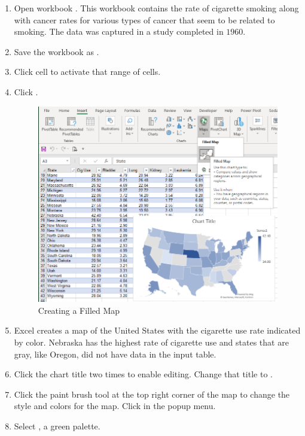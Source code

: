 \begin{enumbox}
	\begin{enumerate}
		\item Open workbook . This workbook contains the rate of cigarette smoking along with cancer rates for various types of cancer that seem to be related to smoking. The data was captured in a study completed in $ 1960 $.
		\item Save the workbook as .
		\item Click cell  to activate that range of cells.
		\item Click .

		\begin{figure}[H]
			\centering
			\includegraphics[width=\maxwidth{.95\linewidth}]{gfx/ch08_fig90}
			\caption{Creating a Filled Map}
			\label{08:fig90}
		\end{figure}

		\item Excel creates a map of the United States with the cigarette use rate indicated by color. Nebraska has the highest rate of cigarette use and states that are gray, like Oregon, did not have data in the input table.
		\item Click the chart title two times to enable editing. Change that title to .
		\item Click the paint brush tool at the top right corner of the map to change the style and colors for the map. Click  in the popup menu.
		\item Select , a green palette.


\end{enumerate}
\end{enumbox}
